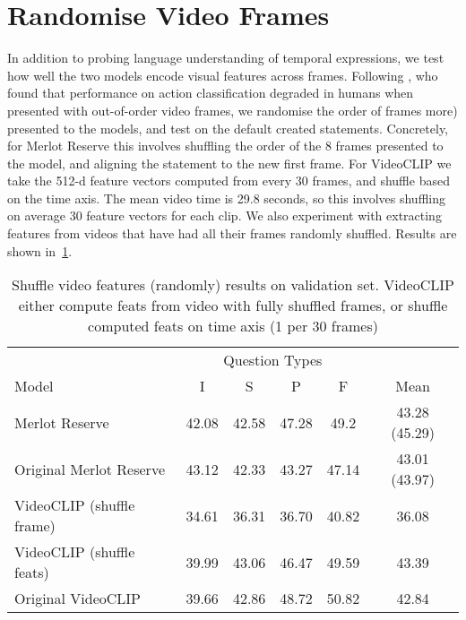 \section{Randomise Video Frames}

In addition to probing language understanding of temporal expressions, we test
how well the two models encode visual features across frames. Following
\citet{sevilla-lara2021temporal}, who found that performance on action
classification degraded in humans when presented with out-of-order video
frames, we randomise the order of frames %
more) presented to the models, and test on the default created statements.
Concretely, for Merlot Reserve this involves shuffling the order of the 8
frames presented to the model, and aligning the statement to the new first
frame. For VideoCLIP we take the 512-d feature vectors computed from every 30
frames, and shuffle based on the time axis. The mean video time is 29.8
seconds, so this involves shuffling on average 30 feature vectors for each
clip. We also experiment with extracting features from videos that have had all
their frames randomly shuffled. Results are shown in~\cref{tab:shuffle_feats}.

\begin{table}[tp]
    \centering
    \caption{Shuffle video features (randomly) results on validation set. %
		VideoCLIP either compute feats from video with fully shuffled frames,
		or shuffle computed feats on time axis (1 per 30 frames)}
    \label{tab:shuffle_feats}
    \begin{tabular}{lccccc}
        \toprule
        \multicolumn{1}{c}{}      & \multicolumn{4}{c}{Question Types}  & \multicolumn{1}{c}{} \\
        \cmidrule(){2-5}
        Model                     & I & S & P & F & Mean \\
        \cmidrule(r){1-1} \cmidrule(){2-5} \cmidrule(l){6-6}
        Merlot Reserve            & 42.08       & 42.58    & 47.28      & 49.2        & 43.28 (45.29) \\
        Original Merlot Reserve   & 43.12       & 42.33    & 43.27      & 47.14       & 43.01 (43.97) \\
        \cmidrule(r){1-1} \cmidrule(){2-5} \cmidrule(l){6-6}
        VideoCLIP (shuffle frame) & 34.61       & 36.31    & 36.70      & 40.82       & 36.08 \\
        VideoCLIP (shuffle feats) & 39.99       & 43.06    & 46.47      & 49.59       & 43.39 \\
        Original VideoCLIP        & 39.66       & 42.86    & 48.72      & 50.82       & 42.84 \\
        \bottomrule
    \end{tabular}
\end{table}

